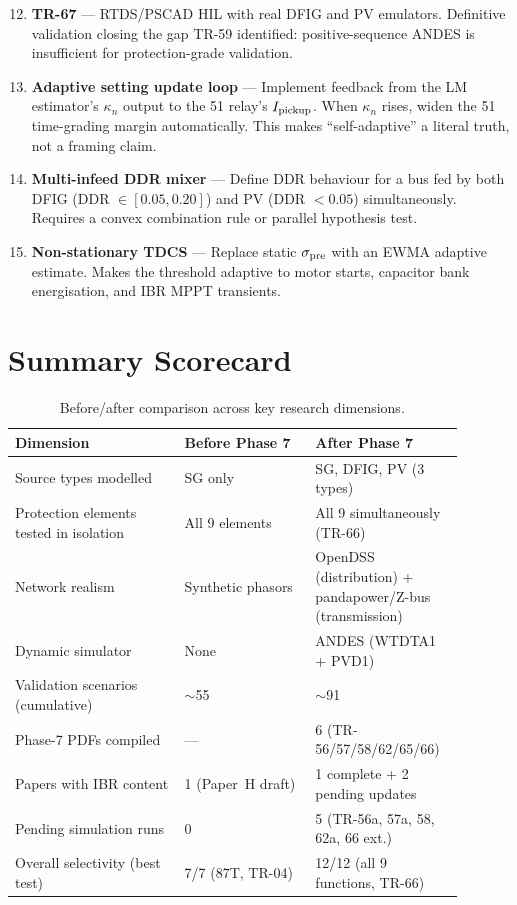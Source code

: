 \documentclass[12pt,a4paper]{article}
\newcommand{\kn}{\kappa_n}
\begin{document}
\begin{enumerate}
  \setcounter{enumi}{11}
  \item \textbf{TR-67} — RTDS/PSCAD HIL with real DFIG and PV emulators.
    Definitive validation closing the gap TR-59 identified:
    positive-sequence ANDES is insufficient for protection-grade validation.
  \item \textbf{Adaptive setting update loop} — Implement feedback from the LM
    estimator's $\kn$ output to the 51 relay's $I_{\rm pickup}$.
    When $\kn$ rises, widen the 51 time-grading margin automatically.
    This makes ``self-adaptive'' a literal truth, not a framing claim.
  \item \textbf{Multi-infeed DDR mixer} — Define DDR behaviour for a bus fed by
    both DFIG (DDR $\in [0.05, 0.20]$) and PV (DDR $< 0.05$) simultaneously.
    Requires a convex combination rule or parallel hypothesis test.
  \item \textbf{Non-stationary TDCS} — Replace static $\sigma_{\rm pre}$ with
    an EWMA adaptive estimate.  Makes the threshold adaptive to motor starts,
    capacitor bank energisation, and IBR MPPT transients.
\end{enumerate}

\section{Summary Scorecard}
\label{sec:scorecard}

\begin{table}[H]
\centering
\caption{Before/after comparison across key research dimensions.}
\label{tab:scorecard}
\begin{tabular}{p{0.35\linewidth}p{0.27\linewidth}p{0.27\linewidth}}
\toprule
Dimension & Before Phase 7 & After Phase 7 \\
\midrule
Source types modelled & SG only & SG, DFIG, PV (3 types) \\
Protection elements tested in isolation & All 9 elements & All 9 simultaneously (TR-66) \\
Network realism & Synthetic phasors & OpenDSS (distribution) + pandapower/Z-bus (transmission) \\
Dynamic simulator & None & ANDES (WTDTA1 + PVD1) \\
Validation scenarios (cumulative) & $\sim$55 & $\sim$91 \\
Phase-7 PDFs compiled & — & 6 (TR-56/57/58/62/65/66) \\
Papers with IBR content & 1 (Paper~H draft) & 1 complete + 2 pending updates \\
Pending simulation runs & 0 & 5 (TR-56a, 57a, 58, 62a, 66 ext.) \\
Overall selectivity (best test) & 7/7 (87T, TR-04) & 12/12 (all 9 functions, TR-66) \\
\bottomrule
\end{tabular}
\end{table}
\end{document}
